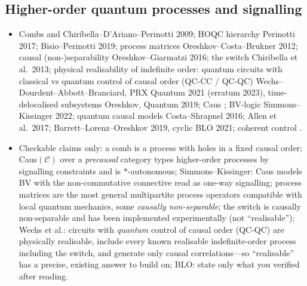 \documentclass[11pt,a4paper]{article}
\newif\ifskeletonnotes
\newcommand{\sknote}[1]{\ifskeletonnotes{\small\color{blue!60!black}\textit{[#1]}}\fi}
\newcommand{\budget}[1]{\ifskeletonnotes{\small\color{red!60!black}\textbf{(\textasciitilde#1 words)}}\fi}
\newcommand{\sknew}[1]{\ifskeletonnotes{\color{purple!70!black}[NEW: #1]}\else#1\fi}
\newcommand{\skim}{\ifskeletonnotes{\color{purple!70!black}[SKIM]}\fi}
\begin{document}
\subsection{Higher-order quantum processes and signalling}\budget{350}
\begin{itemize}[nosep]
\item Combs \cite{quantum_circuit_architecture_Chiribella_2008} and \sknew{Chiribella--D'Ariano--Perinotti 2009}; HOQC hierarchy \sknew{Perinotti 2017; Bisio--Perinotti 2019}; process matrices \sknew{Oreshkov--Costa--Brukner 2012}; causal (non-)separability \sknew{Oreshkov--Giarmatzi 2016}; the switch \sknew{Chiribella et al.\ 2013}; physical realisability of indefinite order: quantum circuits with classical vs quantum control of causal order (QC-CC / QC-QC) \sknew{Wechs--Dourdent--Abbott--Branciard, PRX Quantum 2021 (erratum 2023)}\skim, time-delocalised subsystems \sknew{Oreshkov, Quantum 2019}\skim; Caus \cite{kissinger2019categorical}; BV-logic \sknew{Simmons--Kissinger 2022}; quantum causal models \sknew{Costa--Shrapnel 2016; Allen et al.\ 2017; Barrett--Lorenz--Oreshkov 2019}, cyclic \sknew{BLO 2021}; coherent control \cite{coherent_control_channel_Abbott_2020,resource_theory_comm_Kristjánsson_2020}.
\item Checkable claims only: a comb is a process with holes in a fixed causal order; Caus$(\mathcal{C})$ over a \emph{precausal} category types higher-order processes by signalling constraints and is $*$-autonomous; Simmons--Kissinger: Caus models BV with the non-commutative connective read as one-way signalling; process matrices are the most general multipartite process operators compatible with local quantum mechanics, some \emph{causally non-separable}; the switch is causally non-separable and has been implemented experimentally (not ``realisable''); Wechs et al.: circuits with \emph{quantum} control of causal order (QC-QC) are physically realisable, include every known realisable indefinite-order process including the switch, and generate only causal correlations---so ``realisable'' has a precise, existing answer to build on; BLO: state only what you verified after reading.

\end{itemize}
\end{document}
